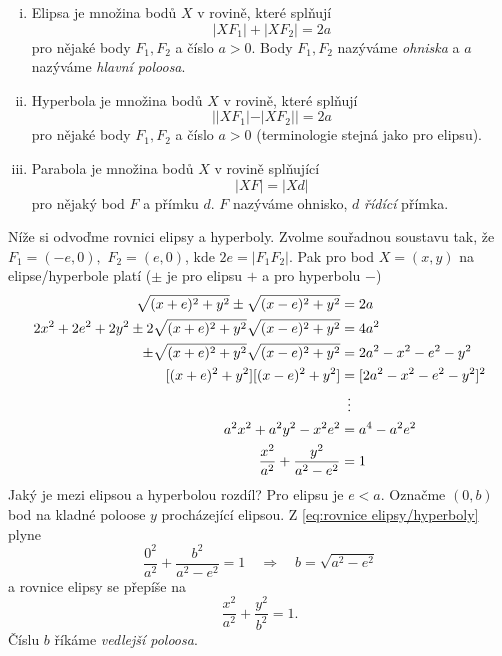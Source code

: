 \begin{definice}\leavevmode
\begin{enumerate}[(i)]
	\item Elipsa je množina bodů $X$ v rovině, které splňují
	\begin{equation*}
		|XF_1|+|XF_2|=2a
	\end{equation*}
	pro nějaké body $F_1,F_2$ a číslo $a>0.$ Body $F_1,F_2$ nazýváme \emph{ohniska} a $a$ nazýváme \emph{hlavní poloosa}.
	\item Hyperbola je množina bodů $X$ v rovině, které splňují
	\begin{equation*}
	  ||XF_1|-|XF_2||=2a
	\end{equation*}
	pro nějaké body $F_1,F_2$ a číslo $a>0$ (terminologie stejná jako pro elipsu).
	\item Parabola je množina bodů $X$ v rovině splňující
\begin{equation*}
  |XF|=|Xd|
\end{equation*}
pro nějaký bod $F$ a přímku $d$. $F$ nazýváme ohnisko, $d$ \emph{řídící} přímka.
\end{enumerate}
\end{definice}

Níže si odvoďme rovnici elipsy a hyperboly. Zvolme souřadnou soustavu tak, že $F_1=(-e,0),$ $F_2=(e,0)$, kde $2e=|F_1F_2|.$ Pak pro bod $X=(x,y)$ na elipse/hyperbole platí ($\pm$ je pro elipsu $+$ a pro hyperbolu $-$)
\begin{align}
	\sqrt{(x+e)^{2}+y^{2}}\pm \sqrt{(x-e)^{2}+y^{2}} &= 2a\notag \\
	2x^{2}+2e^{2}+2y^{2}\pm 2\sqrt{(x+e)^{2}+y^{2}}\sqrt{(x-e)^{2}+y^{2}} &= 4a^{2}\notag \\
	\pm \sqrt{(x+e)^{2}+y^{2}}\sqrt{(x-e)^{2}+y^{2}} &= 2a^{2}-x^{2}-e^{2}-y^{2}\notag \\
        [(x+e)^{2}+y^{2}][(x-e)^{2}+y^{2}] &= [2a^{2}-x^{2}-e^{2}-y^{2}]^{2}\notag \\
					   &\hspace{.5em}\vdots\notag \\
	a^{2}x^{2}+a^{2}y^{2}-x^{2}e^{2}&=a^{4}-a^{2}e^{2}\notag \\
	\frac{x^{2}}{a^{2}}+\frac{y^{2}}{a^{2}-e^{2}}&=1\label{eq:rovnice elipsy/hyperboly}
\end{align}
Jaký je mezi elipsou a hyperbolou rozdíl? Pro elipsu je $e<a.$ Označme $(0,b)$ bod na kladné poloose $y$ procházející elipsou. Z \ref{eq:rovnice elipsy/hyperboly} plyne
\begin{equation*}
  \frac{0^{2}}{a^{2}}+\frac{b^{2}}{a^{2}-e^{2}}=1 \quad \Rightarrow \quad b=\sqrt{a^{2}-e^{2}}
\end{equation*}
a rovnice elipsy se přepíše na
\begin{equation*}
  \frac{x^{2}}{a^{2}}+\frac{y^{2}}{b^{2}}=1.
\end{equation*}
Číslu $b$ říkáme \emph{vedlejší poloosa}.

